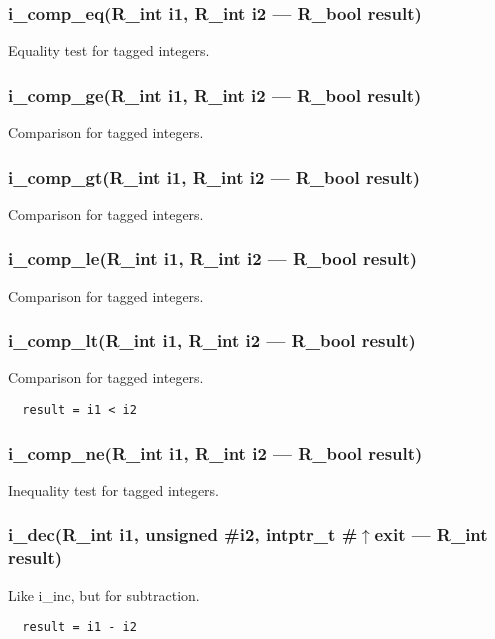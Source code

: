 \subsubsection{i\_comp\_eq(R\_int i1, R\_int i2 --- R\_bool result)}
\vspace{-1em}Equality test for tagged integers. \vspace{-1em}
\subsubsection{i\_comp\_ge(R\_int i1, R\_int i2 --- R\_bool result)}
\vspace{-1em}Comparison for tagged integers. \vspace{-1em}
\subsubsection{i\_comp\_gt(R\_int i1, R\_int i2 --- R\_bool result)}
\vspace{-1em}Comparison for tagged integers. \vspace{-1em}
\subsubsection{i\_comp\_le(R\_int i1, R\_int i2 --- R\_bool result)}
\vspace{-1em}Comparison for tagged integers. \vspace{-1em}
\subsubsection{i\_comp\_lt(R\_int i1, R\_int i2 --- R\_bool result)}
\vspace{-1em}Comparison for tagged integers. \vspace{-1em}\begin{verbatim}
  result = i1 < i2
\end{verbatim}
\vspace{-1em}\vspace{-1em}
\subsubsection{i\_comp\_ne(R\_int i1, R\_int i2 --- R\_bool result)}
\vspace{-1em}Inequality test for tagged integers. \vspace{-1em}
\subsubsection{i\_dec(R\_int i1, unsigned \#i2, intptr\_t \#$\uparrow$exit --- R\_int result)}
\vspace{-1em}Like i\_inc, but for subtraction. \vspace{-1em}\begin{verbatim}
  result = i1 - i2
\end{verbatim}
\vspace{-1em}\vspace{-1em}
